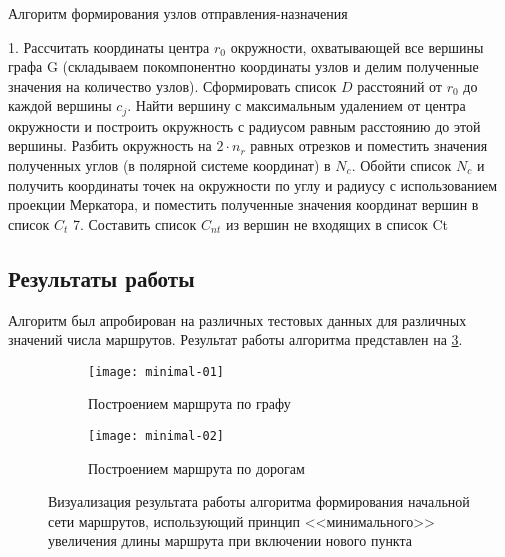 \begin{algorithm}[ht!]
    \caption{Алгоритм формирования узлов отправления-назначения}
    1. Рассчитать координаты центра \( r_0 \) окружности, охватывающей все вершины графа G (складываем 
        покомпонентно координаты узлов и делим полученные значения на количество узлов). Сформировать список \( D \) расстояний от \( r_0 \) до каждой вершины \( c_j \). Найти вершину с максимальным удалением от центра окружности и построить окружность с радиусом 
        равным расстоянию до этой вершины. Разбить окружность на \( 2\cdot n_r \) равных отрезков и поместить значения полученных 
        углов (в полярной системе координат) в \( N_c \). Обойти список \( N_c \) и получить координаты точек на окружности по углу и радиусу с 
        использованием проекции Меркатора, и поместить полученные значения координат вершин в 
        список \( C_t \)\;
    7. Составить список \( C_{nt} \) из вершин не входящих в список Ct\;
\end{algorithm}

\subsection{Результаты работы}
Алгоритм был апробирован на различных тестовых данных для различных значений числа маршрутов. 
Результат работы алгоритма представлен на \ref{img:min-length-01}.
\begin{figure}[h!]
    \centering
    \begin{subfigure}{0.75\textwidth}
        \texttt{[image: minimal-01]}
        \caption{Построением маршрута по графу}
        \label{fig:graph}
    \end{subfigure}
    \begin{subfigure}{0.75\textwidth}
        \texttt{[image: minimal-02]}
        \caption{Построением маршрута по дорогам}
        \label{fig:osrm}
    \end{subfigure}
    \caption{Визуализация результата работы алгоритма формирования начальной сети маршрутов, 
        использующий принцип <<минимального>> увеличения длины маршрута при включении нового пункта%
    }
   \label{img:min-length-01}
\end{figure}

